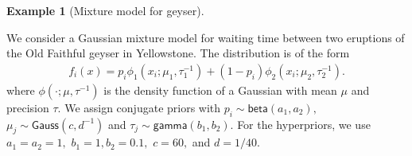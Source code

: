 \documentclass[
  11pt,
  letterpaper,
]{scrbook}
\theoremstyle{definition}
\newtheorem{example}{Example}[chapter]
\theoremstyle{plain}
\theoremstyle{plain}
\theoremstyle{plain}
\theoremstyle{definition}
\theoremstyle{definition}
\theoremstyle{plain}
\theoremstyle{plain}
\theoremstyle{remark}
\begin{document}
\begin{example}[Mixture model for
geyser]\protect\hypertarget{exm-mixture-model}{}\label{exm-mixture-model}

We consider a Gaussian mixture model for waiting time between two
eruptions of the Old Faithful geyser in Yellowstone. The distribution is
of the form \begin{align*}
f_i(x) = p_i \phi_{1}(x_i; \mu_1, \tau_1^{-1}) + (1-p_i)\phi_{2}(x_i; \mu_2, \tau_2^{-1}).
\end{align*} where \(\phi(\cdot; \mu, \tau^{-1})\) is the density
function of a Gaussian with mean \(\mu\) and precision \(\tau.\) We
assign conjugate priors with \(p_i \sim \mathsf{beta}(a_1, a_2),\)
\(\mu_j \sim \mathsf{Gauss}(c, d^{-1})\) and
\(\tau_j \sim \mathsf{gamma}(b_1, b_2).\) For the hyperpriors, we use
\(a_1=a_2=1,\) \(b_1=1, b_2 = 0.1,\) \(c = 60,\) and \(d = 1/40.\)


\end{example}
\end{document}
